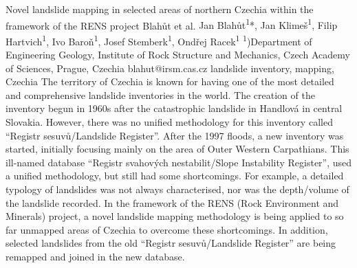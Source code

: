 \abstract
{Novel landslide mapping in selected areas of northern Czechia within the framework of the RENS project} 
{Blahůt et al.} 
{Jan Blahůt\textsuperscript{1}*, Jan Klimeš\textsuperscript{1}, Filip Hartvich\textsuperscript{1}, Ivo Baroň\textsuperscript{1}, Josef Stemberk\textsuperscript{1}, Ondřej Racek\textsuperscript{1}} 
{\POtag} 
{
\textsuperscript{1})Department of Engineering Geology, Institute of Rock Structure and Mechanics, Czech Academy of Sciences, Prague, Czechia
}
{blahut@irsm.cas.cz}  %
{landslide inventory, mapping, Czechia}
{The territory of Czechia is known for having one of the most detailed and comprehensive landslide inventories in the world. The creation of the inventory begun in 1960s after the catastrophic landslide in Handlová in central Slovakia. However, there was no unified methodology for this inventory called “Registr sesuvů/Landslide Register”. After the 1997 floods, a new inventory was started, initially focusing mainly on the area of Outer Western Carpathians. This ill-named database “Registr svahových nestabilit/Slope Instability Register”, used a unified methodology, but still had some shortcomings. For example, a detailed typology of landslides was not always characterised, nor was the depth/volume of the landslide recorded. In the framework of the RENS (Rock Environment and Minerals) project, a novel landslide mapping methodology is being applied to so far unmapped areas of Czechia to overcome these shortcomings. In addition, selected landslides from the old “Registr sesuvů/Landslide Register” are being remapped and joined in the new database. 
}
{
}


